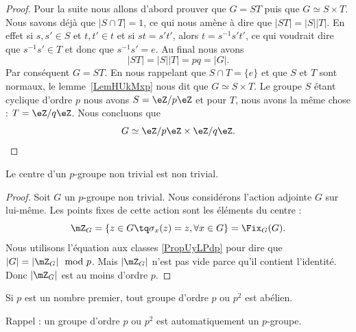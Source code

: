 \begin{proof}
	Pour la suite nous allons d'abord prouver que \( G=ST\) puis que \( G\simeq S\times T\). Nous savons déjà que \( | S\cap T |=1\), ce qui nous amène à dire que \( | ST |=| S | |T |\). En effet si \( s,s'\in S\) et \( t,t'\in t\) et si \( st=s't'\), alors \( t=s^{-1}s't'\), ce qui voudrait dire que \( s^{-1}s'\in T\) et donc que \( s^{-1}s'=e\). Au final nous avons
	\begin{equation}
		| ST |=| S | |T |=pq=| G |.
	\end{equation}
	Par conséquent \( G=ST\). En nous rappelant que \( S\cap T=\{ e \}\) et que \( S\) et \( T\) sont normaux, le lemme~\ref{LemHUkMxp} nous dit que \( G\simeq S\times T\). Le groupe \( S\) étant cyclique d'ordre \( p\) nous avons \( S=\eZ/p\eZ\) et pour \( T\), nous avons la même chose : \( T=\eZ/q\eZ\). Nous concluons que
	\begin{equation}
		G\simeq \eZ/p\eZ\times \eZ/q\eZ.
	\end{equation}
\end{proof}



\begin{theorem} \label{ThoImkljy}
	Le centre d'un \( p\)-groupe non trivial est non trivial.
\end{theorem}

\begin{proof}
	Soit \( G\) un \( p\)-groupe non trivial. Nous considérons l'action adjointe \( G\) sur lui-même. Les points fixes de cette action sont les éléments du centre :
	\begin{equation}
		\mZ_G=\{ z\in G\tq \sigma_x(z)=z, \forall x\in G \}=\Fix_G(G).
	\end{equation}
	Nous utilisons l'équation aux classes \eqref{PropUyLPdp} pour dire que \( | G |=| \mZ_G |\mod p\). Mais \( | \mZ_G |\) n'est pas vide parce qu'il contient l'identité. Donc \( | \mZ_G |\) est au moins d'ordre \( p\).
\end{proof}


\begin{proposition} \label{PropssttFK}
	Si \( p\) est un nombre premier, tout groupe d'ordre \( p\) ou \( p^2\) est abélien.
\end{proposition}
Rappel : un groupe d'ordre \( p\) ou \( p^2\) est automatiquement un \( p\)-groupe.

